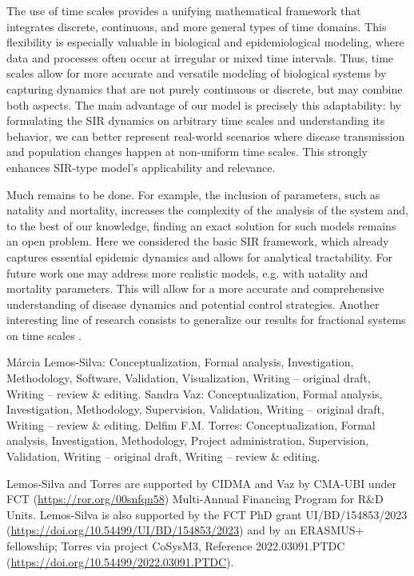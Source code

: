 \documentclass[pdflatex,sn-mathphys-num]{sn-jnl}
\theoremstyle{remark}
\begin{document}
The use of time scales provides a unifying mathematical framework that 
integrates discrete, continuous, and more general types of time domains. This flexibility is 
especially valuable in biological and epidemiological modeling, where data and processes often 
occur at irregular or mixed time intervals. Thus, time scales allow for more accurate and 
versatile modeling of biological systems by capturing dynamics that are not purely continuous 
or discrete, but may combine both aspects.
The main advantage of our model is precisely this adaptability: by formulating the SIR 
dynamics on arbitrary time scales and understanding its behavior, we can better represent 
real-world scenarios where disease transmission and population changes happen at non-uniform 
time scales. This strongly enhances SIR-type model's applicability and relevance.

Much remains to be done. For example, the inclusion of parameters, 
such as natality and mortality, increases the complexity 
of the analysis of the system and, to the best of our knowledge, 
finding an exact solution for such models remains an open problem. 
Here we considered the basic SIR framework, which already captures 
essential epidemic dynamics and allows for analytical 
tractability. For future work one may 
address more realistic models, e.g. 
with natality and mortality parameters. 
This will allow for a more accurate and comprehensive 
understanding of disease dynamics and potential control strategies.
Another interesting line of research consists to generalize our results
for fractional systems on time scales \cite{Hattaf2024,Torres,TM2}.


\backmatter


Márcia Lemos-Silva: Conceptualization, Formal analysis, Investigation, Methodology, 
Software, Validation, Visualization, Writing -- original draft, Writing -- review \& editing. 
Sandra Vaz: Conceptualization, Formal analysis, Investigation, Methodology,
Supervision, Validation, Writing -- original draft, Writing -- review \& editing. 
Delﬁm F.M. Torres: Conceptualization, Formal analysis, Investigation, Methodology, 
Project administration, Supervision, Validation, Writing -- original draft, Writing -- review \& editing.


Lemos-Silva and Torres are supported by CIDMA 
and Vaz by CMA-UBI under 
FCT (\url{https://ror.org/00snfqn58})  
Multi-Annual Financing Program for R\&D Units.
Lemos-Silva is also supported by the FCT PhD grant
UI/BD/154853/2023 (\url{https://doi.org/10.54499/UI/BD/154853/2023})
and by an ERASMUS+ fellowship; 
Torres via project CoSysM3, 
Reference 2022.03091.PTDC 
(\url{https://doi.org/10.54499/2022.03091.PTDC}).
\end{document}
